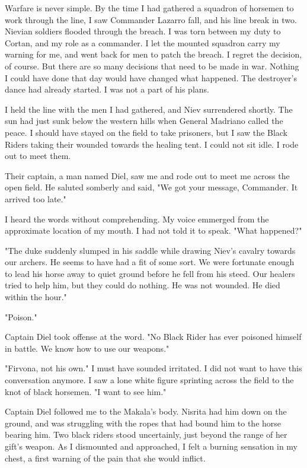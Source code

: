 \documentclass{article}
\begin{document}
Warfare is never simple. By the time I had gathered a squadron of horsemen to work through the line, I saw Commander Lazarro fall, and his line break in two. Nievian soldiers flooded through the breach. I was torn between my duty to Cortan, and my role as a commander. I let the mounted squadron carry my warning for me, and went back for men to patch the breach. I regret the decision, of course. But there are so many decisions that need to be made in war. Nothing I could have done that day would have changed what happened. The destroyer's dance had already started. I was not a part of his plans.

I held the line with the men I had gathered, and Niev surrendered shortly. The sun had just sunk below the western hills when General Madriano called the peace. I should have stayed on the field to take prisoners, but I saw the Black Riders taking their wounded towards the healing tent. I could not sit idle. I rode out to meet them.

Their captain, a man named Diel, saw me and rode out to meet me across the open field. He saluted somberly and said, "We got your message, Commander. It arrived too late."

I heard the words without comprehending. My voice emmerged from the approximate location of my mouth. I had not told it to speak. "What happened?"

"The duke suddenly slumped in his saddle while drawing Niev's cavalry towards our archers. He seems to have had a fit of some sort. We were fortunate enough to lead his horse away to quiet ground before he fell from his steed. Our healers tried to help him, but they could do nothing. He was not wounded. He died within the hour." 

"Poison."

Captain Diel took offense at the word. "No Black Rider has ever poisoned himself in battle. We know how to use our weapons."

"Firvona, not his own." I must have sounded irritated. I did not want to have this conversation anymore. I saw a lone white figure sprinting across the field to the knot of black horsemen. "I want to see him."  

Captain Diel followed me to the Makala's body. Nisrita had him down on the ground, and was struggling with the ropes that had bound him to the horse bearing him. Two black riders stood uncertainly, just beyond the range of her gift's weapon. As I dismounted and approached, I felt a burning sensation in my chest, a first warning of the pain that she would inflict. 
\end{document}

